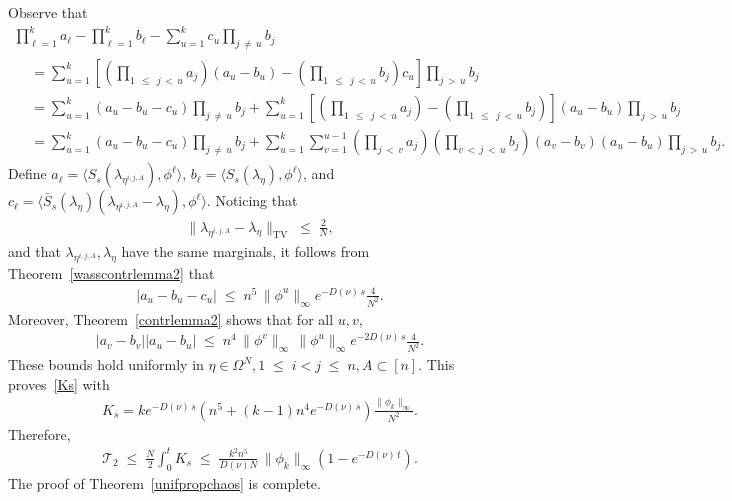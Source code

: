 \documentclass[10pt,a4paper]{article}
\renewcommand{\leq}{\;\leqslant\;}
\newcommand{\scalar}[2]{\langle #1, #2\rangle}
\newcommand{\tv}{\mathrm{TV}}
\newcommand{\cT}{\mathcal{T}}
\let\l=\lambda
\let\O=\Omega
\begin{document}
Observe that
\begin{multline}\label{eq:inpriaa3}
\prod_{\ell=1}^ka_\ell -\prod_{\ell=1}^kb_\ell - \sum_{u=1}^kc_u\prod_{j\,\neq\,u}b_j 
\\
\begin{aligned}
&= \sum_{u=1}^k\left[\left(\prod_{1\,\leq\,j \,<\,u}a_j\right)(a_u-b_u) - \left(\prod_{1 \,\leq\,j\,<\,u}b_j\right)c_u\right]\prod_{j\,>\,u}b_j\\
& = \sum_{u=1}^k(a_u-b_u-c_u)\prod_{j\,\neq\, u}b_j +
\sum_{u=1}^k\left[\left(\prod_{1\,\leq\,j\,< \,u}a_j\right) - \left(\prod_{1\,\leq\,j\,<\, u}b_j\right)\right](a_u-b_u)\prod_{j\,>\,u}b_j
\\
&= \sum_{u=1}^k(a_u-b_u-c_u)\prod_{j\,\neq\,u}b_j +
\sum_{u=1}^k\sum_{v=1}^{u-1}\left(\prod_{j\,< \,v}a_j\right)\left(\prod_{v\,<\,j\,<\,u}b_j\right)(a_v-b_v)(a_u-b_u)\prod_{j\,>\,u}b_j.
\end{aligned}
\end{multline}
Define $a_\ell = \scalar{S_s(\l_{\eta^{i,j,A}})}{\phi^\ell} $, $b_\ell=\scalar{S_s(\l_{\eta})}{\phi^\ell} $, and $c_\ell = \scalar{\bar S_s(\l_\eta)(\l_{\eta^{i,j,A}} -\l_{\eta})}{\phi^\ell}$. Noticing that
\begin{align}
\|\l_{\eta^{i,j,A}} -\l_{\eta}\|_\tv\leq \frac2N,
\end{align}
and that $\l_{\eta^{i,j,A}},\l_{\eta}$ have the same marginals, it follows from Theorem~\ref{wasscontrlemma2} that
\begin{align}\label{eq:abc1}
|a_u-b_u-c_u|\leq n^5\,\|\phi^u\|_\infty e^{-D(\nu)\, s} \frac{4}{N^2}.
\end{align}
Moreover, Theorem~\ref{contrlemma2} shows that for all $u,v$,
\begin{align}\label{eq:abc2}
|a_v-b_v||a_u-b_u|\leq n^4\,\|\phi^v\|_\infty\,\|\phi^u\|_\infty e^{-2D(\nu)\, s} \frac{4}{N^2}.
\end{align}
These bounds hold uniformly in $\eta\in\O^N,1\leq i<j\leq n,A\subset[n]$. This proves~\eqref{Ks} with
\begin{align}\label{eq:inprinc}
K_s =ke^{-D(\nu)\, s}\left(n^5 + (k-1)n^4e^{-D(\nu)\, s}\right) \frac{\|\phi_k\|_\infty }{N^2}.
\end{align}
Therefore,
\begin{align}\label{eq:inprinc2}
\cT_2\leq \frac{N}2\int_0^tK_s \leq \frac{k^2n^5}{D(\nu) N}\,\|\phi_k\|_\infty \left(1-e^{-D(\nu)\, t}\right).
\end{align}
The proof of Theorem~\ref{unifpropchaos} is complete.
\end{document}
